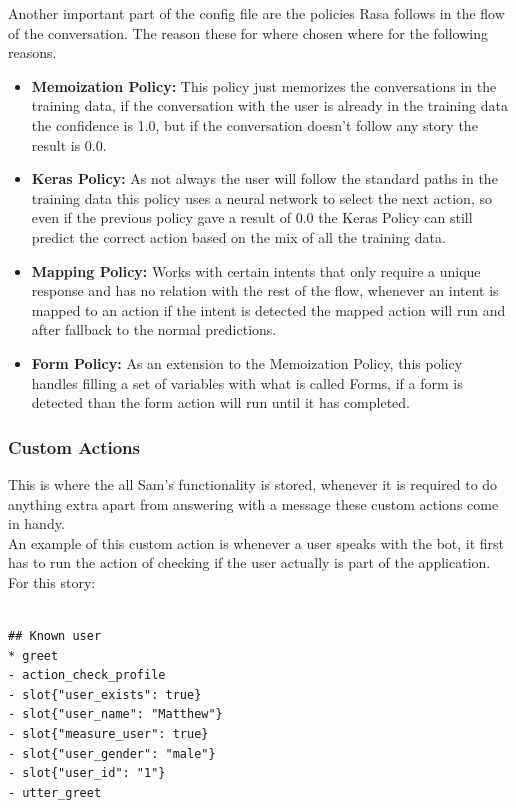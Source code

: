 Another important part of the config file are the policies Rasa follows in the flow of the conversation. The reason these for where chosen where for the following reasons.

\begin{itemize}
	\item {\textbf{Memoization Policy:} This policy just memorizes the conversations in the training data, if the conversation with the user is already in the training data the confidence is 1.0, but if the conversation doesn’t follow any story the result is 0.0.}
	\item {\textbf{Keras Policy:} As not always the user will follow the standard paths in the training data this policy uses a neural network to select the next action, so even if the previous policy gave a result of 0.0 the Keras Policy can still predict the correct action based on the mix of all the training data.}
	\item {\textbf{Mapping Policy:} Works with certain intents that only require a unique response and has no relation with the rest of the flow, whenever an intent is mapped to an action if the intent is detected the mapped action will run and after fallback to the normal predictions.}
	\item {\textbf{Form Policy:} As an extension to the Memoization Policy, this policy handles filling a set of variables with what is called Forms, if a form is detected than the form action will run until it has completed.}
\end{itemize}

\subsubsection{Custom Actions}\label{sec:chap4_cust_act}

This is where the all Sam’s functionality is stored, whenever it is required to do anything extra apart from answering with a message these custom actions come in handy.\\
An example of this custom action is whenever a user speaks with the bot, it first has to run the action of checking if the user actually is part of the application.\\
For this story:

\begin{lstlisting}[caption={Known User Story},captionpos=b]

## Known user
* greet
- action_check_profile
- slot{"user_exists": true}
- slot{"user_name": "Matthew"}
- slot{"measure_user": true}
- slot{"user_gender": "male"}
- slot{"user_id": "1"}
- utter_greet


\end{lstlisting}

